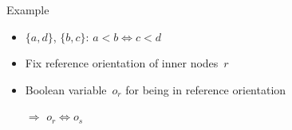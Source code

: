 \begin{frame}{Example}
\begin{overprint}
\begin{figure}
{\begin{tikzpicture}
\end{tikzpicture}}
\end{figure}

\begin{itemize}
\item $\{a, d\}$, $\{b, c\}$: $a < b \Leftrightarrow c < d$\\
\item Fix reference orientation of inner nodes~$r$
\item Boolean variable~$o_r$ for being in reference orientation  
\item[$\Rightarrow$] $o_r \Leftrightarrow o_s$
\end{itemize}
\end{overprint}
\end{frame}



